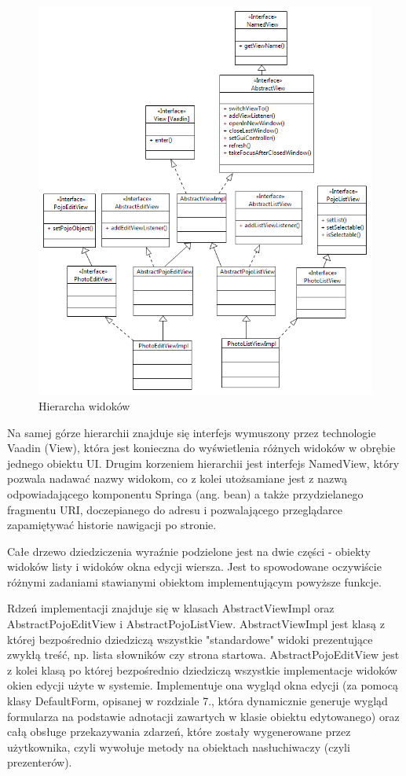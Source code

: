 \begin{figure} [H]
    \begin{center}
	\includegraphics[scale=.55]{img/viewHierarchy.png}
	\caption{Hierarcha widoków}
	\label{viewHierarchy}
    \end{center}
\end{figure}

Na samej górze hierarchii znajduje się interfejs wymuszony przez technologie Vaadin (View), która jest konieczna do wyświetlenia różnych widoków w obrębie jednego obiektu UI. Drugim korzeniem hierarchii jest interfejs NamedView, który pozwala nadawać nazwy widokom, co z kolei utożsamiane jest z nazwą odpowiadającego komponentu Springa (ang. bean) a także przydzielanego fragmentu URI, doczepianego do adresu i pozwalającego przeglądarce zapamiętywać historie nawigacji po stronie.

Całe drzewo dziedziczenia wyraźnie podzielone jest na dwie części - obiekty widoków listy i widoków okna edycji wiersza. Jest to spowodowane oczywiście różnymi zadaniami stawianymi obiektom implementującym powyższe funkcje.

\newpage
Rdzeń implementacji znajduje się w klasach AbstractViewImpl oraz AbstractPojoEditView i AbstractPojoListView. AbstractViewImpl jest klasą z której bezpośrednio dziedziczą wszystkie "standardowe" widoki prezentujące zwykłą treść, np. lista słowników czy strona startowa. AbstractPojoEditView jest z kolei klasą po której bezpośrednio dziedziczą wszystkie implementacje widoków okien edycji użyte w systemie. Implementuje ona wygląd okna edycji (za pomocą klasy DefaultForm, opisanej w rozdziale 7., która dynamicznie generuje wygląd formularza na podstawie adnotacji zawartych w klasie obiektu edytowanego) oraz całą obsługe przekazywania zdarzeń, które zostały wygenerowane przez użytkownika, czyli wywołuje metody na obiektach nasłuchiwaczy (czyli prezenterów).

